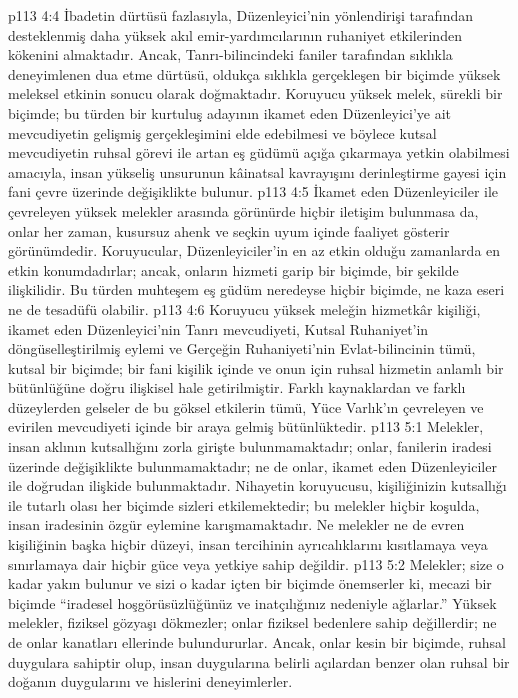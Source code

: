 \vs p113 4:4 İbadetin dürtüsü fazlasıyla, Düzenleyici’nin yönlendirişi tarafından desteklenmiş daha yüksek akıl emir\hyp{}yardımcılarının ruhaniyet etkilerinden kökenini almaktadır. Ancak, Tanrı\hyp{}bilincindeki faniler tarafından sıklıkla deneyimlenen dua etme dürtüsü, oldukça sıklıkla gerçekleşen bir biçimde yüksek meleksel etkinin sonucu olarak doğmaktadır. Koruyucu yüksek melek, sürekli bir biçimde; bu türden bir kurtuluş adayının ikamet eden Düzenleyici’ye ait mevcudiyetin gelişmiş gerçekleşimini elde edebilmesi ve böylece kutsal mevcudiyetin ruhsal görevi ile artan eş güdümü açığa çıkarmaya yetkin olabilmesi amacıyla, insan yükseliş unsurunun kâinatsal kavrayışını derinleştirme gayesi için fani çevre üzerinde değişiklikte bulunur.
\vs p113 4:5 İkamet eden Düzenleyiciler ile çevreleyen yüksek melekler arasında görünürde hiçbir iletişim bulunmasa da, onlar her zaman, kusursuz ahenk ve seçkin uyum içinde faaliyet gösterir görünümdedir. Koruyucular, Düzenleyiciler’in en az etkin olduğu zamanlarda en etkin konumdadırlar; ancak, onların hizmeti garip bir biçimde, bir şekilde ilişkilidir. Bu türden muhteşem eş güdüm neredeyse hiçbir biçimde, ne kaza eseri ne de tesadüfü olabilir.
\vs p113 4:6 Koruyucu yüksek meleğin hizmetkâr kişiliği, ikamet eden Düzenleyici’nin Tanrı mevcudiyeti, Kutsal Ruhaniyet’in döngüselleştirilmiş eylemi ve Gerçeğin Ruhaniyeti’nin Evlat\hyp{}bilincinin tümü, kutsal bir biçimde; bir fani kişilik içinde ve onun için ruhsal hizmetin anlamlı bir bütünlüğüne doğru ilişkisel hale getirilmiştir. Farklı kaynaklardan ve farklı düzeylerden gelseler de bu göksel etkilerin tümü, Yüce Varlık’ın çevreleyen ve evirilen mevcudiyeti içinde bir araya gelmiş bütünlüktedir.
\vs p113 5:1 Melekler, insan aklının kutsallığını zorla girişte bulunmamaktadır; onlar, fanilerin iradesi üzerinde değişiklikte bulunmamaktadır; ne de onlar, ikamet eden Düzenleyiciler ile doğrudan ilişkide bulunmaktadır. Nihayetin koruyucusu, kişiliğinizin kutsallığı ile tutarlı olası her biçimde sizleri etkilemektedir; bu melekler hiçbir koşulda, insan iradesinin özgür eylemine karışmamaktadır. Ne melekler ne de evren kişiliğinin başka hiçbir düzeyi, insan tercihinin ayrıcalıklarını kısıtlamaya veya sınırlamaya dair hiçbir güce veya yetkiye sahip değildir.
\vs p113 5:2 Melekler; size o kadar yakın bulunur ve sizi o kadar içten bir biçimde önemserler ki, mecazi bir biçimde “iradesel hoşgörüsüzlüğünüz ve inatçılığınız nedeniyle ağlarlar.” Yüksek melekler, fiziksel gözyaşı dökmezler; onlar fiziksel bedenlere sahip değillerdir; ne de onlar kanatları ellerinde bulundururlar. Ancak, onlar kesin bir biçimde, ruhsal duygulara sahiptir olup, insan duygularına belirli açılardan benzer olan ruhsal bir doğanın duygularını ve hislerini deneyimlerler.
